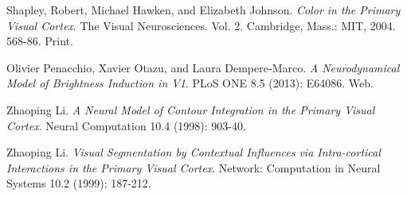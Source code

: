 \documentclass[journal,onecolumn]{IEEEtran}
\begin{document}

%
%
%
\begin{thebibliography}{1}

  Shapley, Robert, Michael Hawken, and Elizabeth Johnson.
  \emph{Color in the Primary Visual Cortex}.
  The Visual Neurosciences. Vol. 2.
  Cambridge, Mass.: MIT, 2004.
  568-86.
  Print.

  Olivier Penacchio, Xavier Otazu, and Laura Dempere-Marco.
  \emph{A Neurodynamical Model of Brightness Induction in V1}.
  PLoS ONE 8.5 (2013): E64086.
  Web.

  Zhaoping Li.
  \emph{A Neural Model of Contour Integration in the Primary Visual Cortex}.
  Neural Computation 10.4 (1998): 903-40.

  Zhaoping Li.
  \emph{Visual Segmentation by Contextual Influences via Intra-cortical Interactions in the Primary Visual Cortex}.
  Network: Computation in Neural Systems 10.2 (1999): 187-212.

    
\end{thebibliography}

% 




\end{document}
